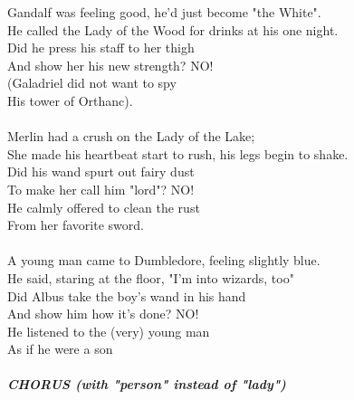 \documentclass[twoside,13pt,openany,letterpaper]{memoir}%
\begin{document}

Gandalf was feeling good, he'd just become "the White".\\
He called the Lady of the Wood for drinks at his one night.\\
Did he press his staff to her thigh\\
And show her his new strength? NO!\\
(Galadriel did not want to spy\\
His tower of Orthanc).\\
\\
Merlin had a crush on the Lady of the Lake;\\
She made his heartbeat start to rush, his legs begin to shake.\\
Did his wand spurt out fairy dust\\
To make her call him "lord"? NO!\\
He calmly offered to clean the rust\\
From her favorite sword.\\
\\
A young man came to Dumbledore, feeling slightly blue.\\
He said, staring at the floor, "I'm into wizards, too"\\
Did Albus take the boy's wand in his hand\\
And show him how it's done? NO!\\
He listened to the (very) young man\\
As if he were a son\\\\
\Large
\textit{\textbf{CHORUS (with "person" instead of "lady")}}\normalsize

\end{document}
